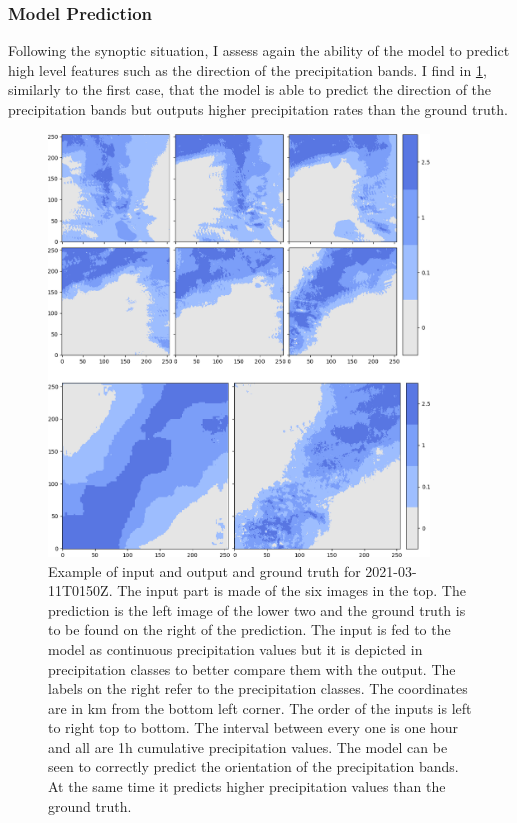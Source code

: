 \subsubsection{Model Prediction}
Following the synoptic situation, I assess again the ability of the model to predict high level features such as the direction of the precipitation bands. I find in \cref{fig:examplescene2}, similarly to the first case, that the model is able to predict the direction of the precipitation bands but outputs higher precipitation rates than the ground truth.
\begin{figure}[!h]
    \centering
    \includegraphics[width=0.9\textwidth]{2103110150.png}
    \caption{Example of input and output and ground truth for 2021-03-11T0150Z. The input part is made of the six images in the top. The prediction is the left image of the lower two and the ground truth is to be found on the right of the prediction. The input is fed to the model as continuous precipitation values but it is depicted in precipitation classes to better compare them with the output. The labels on the right refer to the precipitation classes. The coordinates are in km from the bottom left corner. The order of the inputs is left to right top to bottom. The interval between every one is one hour and all are 1h cumulative precipitation values. The model can be seen to correctly predict the orientation of the precipitation bands. At the same time it predicts higher precipitation values than the ground truth.}
    \label{fig:examplescene2}
\end{figure}

